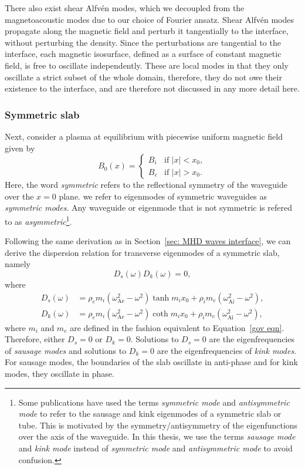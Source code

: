\documentclass[12pt]{../style-files/ociamthesis}
\begin{document}
There also exist shear Alfv\'{e}n modes, which we decoupled from the magnetoacoustic modes due to our choice of Fourier ansatz. Shear Alfv\'{e}n modes propagate along the magnetic field and perturb it tangentially to the interface, without perturbing the density. Since the perturbations are tangential to the interface, each magnetic isosurface, defined as a surface of constant magnetic field, is free to oscillate independently. These are local modes in that they only oscillate a strict subset of the whole domain, therefore, they do not owe their existence to the interface, and are therefore not discussed in any more detail here.


\subsubsection{Symmetric slab} \label{sec: MHD waves sym slab}

Next, consider a plasma at equilibrium  with piecewise uniform magnetic field given by
\begin{equation}
B_0(x) =
\begin{cases}
B_i & \text{if } |x| < x_0, \\
B_e & \text{if } |x| > x_0.
\end{cases}
\end{equation}
Here, the word \textit{symmetric} refers to the reflectional symmetry of the waveguide over the $x = 0$ plane. we refer to eigenmodes of symmetric waveguides as \textit{symmetric modes}. Any waveguide or eigenmode that is not symmetric is refered to as \textit{asymmetric}\footnote{Some publications have used the terms \textit{symmetric mode} and \textit{antisymmetric mode} to refer to the sausage and kink eigenmodes of a symmetric slab or tube. This is motivated by the symmetry/antisymmetry of the eigenfunctions over the axis of the waveguide. In this thesis, we use the terms \textit{sausage mode} and \textit{kink mode} instead of \textit{symmetric mode} and \textit{antisymmetric mode} to avoid confusion.}.

Following the same derivation as in Section~\ref{sec: MHD waves interface}, we can derive the dispersion relation for transverse eigenmodes of a symmetric slab, namely
\begin{equation}
	D_s(\omega)D_k(\omega) = 0, \label{DR sym slab}
\end{equation}
where
\begin{align}
	D_s(\omega) &= \rho_em_i(\omega_\textrm{Ae}^2 - \omega^2)\tanh{m_ix_0} + \rho_im_e(\omega_\textrm{Ai}^2 - \omega^2), \\
	D_k(\omega) &= \rho_em_i(\omega_\textrm{Ae}^2 - \omega^2)\coth{m_ix_0} + \rho_im_e(\omega_\textrm{Ai}^2 - \omega^2),
\end{align}
where $m_i$ and $m_e$ are defined in the fashion equivalent to Equation~\eqref{gov eqn}. Therefore, either $D_s = 0$ or $D_k = 0$. Solutions to $D_s = 0$ are the eigenfrequencies of \textit{sausage modes} and solutions to $D_k = 0$ are the eigenfrequencies of \textit{kink modes}. For sausage modes, the boundaries of the slab oscillate in anti-phase and for kink modes, they oscillate in phase.
\end{document}
